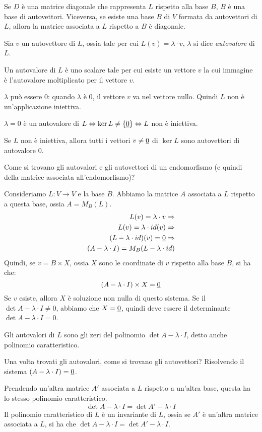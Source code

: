 Se $D$ \`e una matrice diagonale che rappresenta $L$ rispetto alla base $B$, $B$ \`e una base di autovettori. Viceversa, se esiste una base $B$ di $V$ formata da autovettori di $L$, allora la matrice associata a $L$ rispetto a $B$ \`e diagonale.

Sia $v$ un autovettore di $L$, ossia tale per cui $L(v) = \lambda \cdot v$, $\lambda$ si dice \emph{autovalore} di $L$.

Un autovalore di $L$ \`e uno scalare tale per cui esiste un vettore $v$ la cui immagine \`e l'autovalore moltiplicato per il vettore $v$.

$\lambda$ pu\`o essere 0: quando $\lambda$ \`e 0, il vettore $v$ va nel vettore nullo. Quindi $L$ non \`e un'applicazione iniettiva.

$\lambda = 0$ \`e un autovalore di $L \Leftrightarrow \ker L \neq \{ \underline{0} \} \Leftrightarrow L$ non \`e iniettiva.

Se $L$ non \`e iniettiva, allora tutti i vettori $v \neq \underline{0}$ di $\ker L$ sono autovettori di autovalore 0.

Come si trovano gli autovalori e gli autovettori di un endomorfismo (e quindi della matrice associata all'endomorfismo)?

Consideriamo $L : V \to V$ e la base $B$. Abbiamo la matrice $A$ associata a $L$ rispetto a questa base, ossia $A = M_{B} (L)$.
\begin{align*}
L(v) = \lambda \cdot v \Rightarrow \\
L(v) = \lambda \cdot id(v) \Rightarrow \\
(L - \lambda \cdot id) (v) = \underline{0} \Rightarrow \\
(A - \lambda \cdot I) = M_B (L - \lambda \cdot id)
\end{align*}
Quindi, se $v = B \times X$, ossia $X$ sono le coordinate di $v$ rispetto alla base $B$, si ha che:
\[
(A - \lambda \cdot I) \times X = \underline{0}
\]
Se $v$ esiste, allora $X$ \`e soluzione non nulla di questo sistema. Se il $\det{A - \lambda \cdot I} \neq 0$, abbiamo che $X = \underline{0}$, quindi deve essere il determinante $\det{A - \lambda \cdot I} = 0$.

Gli autovalori di $L$ sono gli zeri del polinomio $\det{A - \lambda \cdot I}$, detto anche polinomio caratteristico.

Una volta trovati gli autovalori, come si trovano gli autovettori? Risolvendo il sistema $(A - \lambda \cdot I) = \underline{0}$.

Prendendo un'altra matrice $A'$ associata a $L$ rispetto a un'altra base, questa ha lo stesso polinomio caratteristico.
\[
\det{A - \lambda \cdot I} = \det{A' - \lambda \cdot I}
\]
Il polinomio caratteristico di $L$ \`e un invariante di $L$, ossia se $A'$ \`e un'altra matrice associata a $L$, si ha che $\det{A - \lambda \cdot I} = \det{A' - \lambda \cdot I}$.

